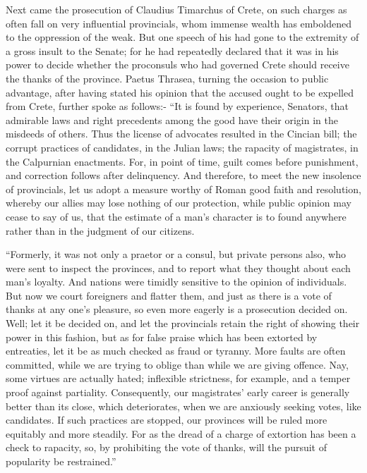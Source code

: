 Next came the prosecution of Claudius Timarchus of Crete, on such charges as often fall on very influential provincials, whom immense wealth has emboldened to the oppression of the weak. But one speech of his had gone to the extremity of a gross insult to the Senate; for he had repeatedly declared that it was in his power to decide whether the proconsuls who had governed Crete should receive the thanks of the province. Paetus Thrasea, turning the occasion to public advantage, after having stated his opinion that the accused ought to be expelled from Crete, further spoke as follows:- ``It is found by experience, Senators, that admirable laws and right precedents among the good have their origin in the misdeeds of others. Thus the license of advocates resulted in the Cincian bill; the corrupt practices of candidates, in the Julian laws; the rapacity of magistrates, in the Calpurnian enactments. For, in point of time, guilt comes before punishment, and correction follows after delinquency. And therefore, to meet the new insolence of provincials, let us adopt a measure worthy of Roman good faith and resolution, whereby our allies may lose nothing of our protection, while public opinion may cease to say of us, that the estimate of a man's character is to found anywhere rather than in the judgment of our citizens.


``Formerly, it was not only a praetor or a consul, but private persons also, who were sent to inspect the provinces, and to report what they thought about each man's loyalty. And nations were timidly sensitive to the opinion of individuals. But now we court foreigners and flatter them, and just as there is a vote of thanks at any one's pleasure, so even more eagerly is a prosecution decided on. Well; let it be decided on, and let the provincials retain the right of showing their power in this fashion, but as for false praise which has been extorted by entreaties, let it be as much checked as fraud or tyranny. More faults are often committed, while we are trying to oblige than while we are giving offence. Nay, some virtues are actually hated; inflexible strictness, for example, and a temper proof against partiality. Consequently, our magistrates' early career is generally better than its close, which deteriorates, when we are anxiously seeking votes, like candidates. If such practices are stopped, our provinces will be ruled more equitably and more steadily. For as the dread of a charge of extortion has been a check to rapacity, so, by prohibiting the vote of thanks, will the pursuit of popularity be restrained.''


